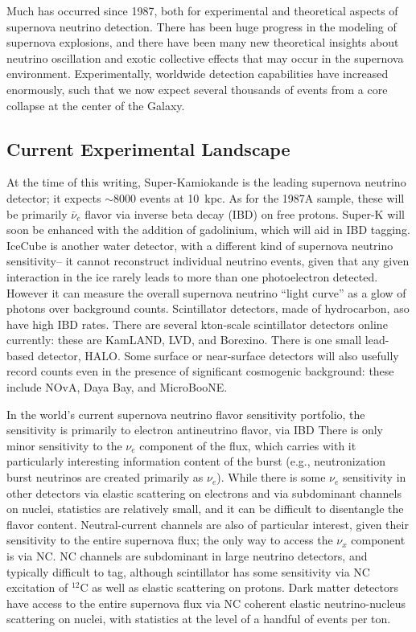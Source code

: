 Much has occurred since 1987, both for experimental and theoretical
aspects of supernova neutrino detection.
There has been huge progress in the modeling of supernova explosions,
and there have been many new theoretical insights about
neutrino oscillation and exotic collective effects that may occur in
the supernova environment.    Experimentally,
worldwide detection capabilities have increased enormously, such that
we now expect several thousands of events from a core collapse at the center
of the Galaxy.

\subsection{Current Experimental Landscape}
At the time of this writing, Super-Kamiokande is the leading supernova
neutrino detector; it expects $\sim$8000 events at 10~kpc.  As for
the 1987A sample, these will be primarily $\bar{\nu}_e$ flavor via
inverse beta decay (IBD) on free protons.  Super-K will soon be
enhanced with the addition of gadolinium, which will aid in IBD
tagging.  IceCube is another water detector, with a different kind of
supernova neutrino sensitivity-- it cannot reconstruct individual
neutrino events, given that any given interaction in the ice rarely
leads to more than one photoelectron detected.  However it can measure
the overall supernova neutrino ``light curve'' as a glow of photons
over background counts.  Scintillator detectors, made of hydrocarbon,
aso have high IBD rates.  There are several kton-scale scintillator
detectors online currently: these are KamLAND, LVD, and Borexino.
There is one small lead-based detector, HALO.  Some surface or
near-surface detectors will also usefully record counts even in the
presence of significant cosmogenic background: these include NOvA,
Daya Bay, and MicroBooNE.

In the world's current supernova neutrino flavor sensitivity
portfolio, the sensitivity is primarily to electron antineutrino
flavor, via IBD There is only minor sensitivity to the $\nu_e$
component of the flux, which carries with it particularly interesting
information content of the burst (e.g., neutronization burst neutrinos
are created primarily as $\nu_e$).  While there is some $\nu_e$
sensitivity in other detectors via elastic scattering on electrons and
via subdominant channels on nuclei, statistics are relatively small,
and it can be difficult to disentangle the flavor content.
Neutral-current channels are also of particular interest, given their
sensitivity to the entire supernova flux; the only way to access the
$\nu_x$ component is via NC.  NC channels are subdominant in large
neutrino detectors, and typically difficult to tag, although
scintillator has some sensitivity via NC excitation of $^{12}$C as
well as elastic scattering on protons.  Dark matter detectors have
access to the entire supernova flux via NC coherent elastic
neutrino-nucleus scattering on nuclei, with statistics at the level of
a handful of events per ton.

